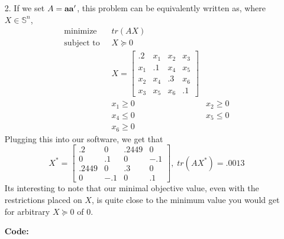 \documentclass[11pt]{article}
\theoremstyle{definition}
\begin{document}
\begin{itemize}
    \item[2.]
        If we set \(A={\bf aa}'\), this problem can be equivalently written as, where \(X\in\mathbb{S}^n\),
        \begin{align*}
            \text{minimize    }\; & tr(AX) \\
            \text{subject to  }\; & X \succeq 0 \\
                                  & X =\left[ \begin{array}{cccc} .2  & x_1 & x_2 & x_3 \\
                                                                  x_1 & .1  & x_4 & x_5 \\
                                                                  x_2 & x_4 & .3  & x_6 \\
                                                                  x_3 & x_5 & x_6 & .1 \end{array} \right]  \\
                                  & x_1 \geq 0 & x_2 \geq 0 \\
                                  & x_4 \leq 0 & x_5 \leq 0 \\
                                  & x_6 \geq 0
        \end{align*}
        Plugging this into our software, we get that
        \[X^* = \left[ \begin{array}{cccc} .2    & 0   & .2449 &   0 \\
                                            0    & .1  &    0  & -.1 \\
                                           .2449 & 0   & .3    &   0 \\
                                            0    & -.1 &    0  &   .1 \end{array} \right],
         \; tr(AX^*) = .0013 \]
        Its interesting to note that our minimal objective value, even with the restrictions placed on $X$, is quite close to the minimum value you would get for arbitrary $X\succeq0$ of 0.  

        {\bf Code:} \\
        


\end{itemize}
\end{document}
